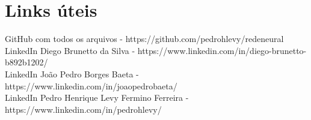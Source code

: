 \documentclass[12pt]{article}
\begin{document}
\section{Links úteis}

GitHub com todos os arquivos - https://github.com/pedrohlevy/redeneural\\
LinkedIn Diego Brunetto da Silva - https://www.linkedin.com/in/diego-brunetto-b892b1202/\\
LinkedIn João Pedro Borges Baeta - https://www.linkedin.com/in/joaopedrobaeta/\\
LinkedIn Pedro Henrique Levy Fermino Ferreira - https://www.linkedin.com/in/pedrohlevy/\\
\end{document}

